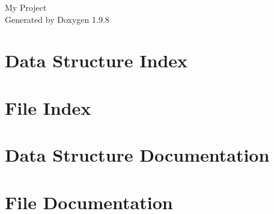 \documentclass[twoside]{book}
\newcommand{\+}{\discretionary{\mbox{\scriptsize$\hookleftarrow$}}{}{}}
\newcommand{\clearemptydoublepage}{%
    \newpage{\pagestyle{empty}\cleardoublepage}%
  }
\begin{document}
  \raggedbottom
    \hypersetup{pageanchor=false,
                bookmarksnumbered=true,
                pdfencoding=unicode
               }
  \begin{titlepage}
  \vspace*{7cm}
  \begin{center}%
  {\Large My Project}\\
  \vspace*{1cm}
  {\large Generated by Doxygen 1.9.8}\\
  \end{center}
  \end{titlepage}
  \clearemptydoublepage
  \tableofcontents
  \clearemptydoublepage
  \hypersetup{pageanchor=true}
\chapter{Data Structure Index}

\chapter{File Index}

\chapter{Data Structure Documentation}

\chapter{File Documentation}




  \backmatter
  \newpage
  \clearemptydoublepage
  \printindex
\end{document}
